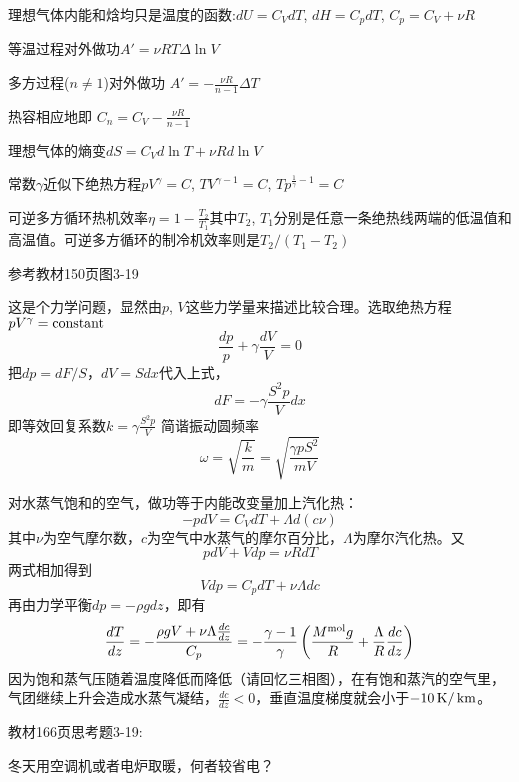 \documentclass[CJK]{beamer}
\begin{document}
\begin{frame}
  \bch
  \bitem
  \item{理想气体内能和焓均只是温度的函数:$dU = C_V dT$, $dH = C_p dT$, $C_p = C_V+\nu R$}
  \item{等温过程对外做功$A'=\nu RT \Delta \ln V$}
  \item{
  多方过程($n\ne 1$)对外做功
  $A' = -\frac{\nu R}{n-1}\Delta T$
  
  热容相应地即
  $C_n = C_V - \frac{\nu R}{n-1}$}
  \item{理想气体的熵变$ dS = C_V d \ln T + \nu R d\ln V$}
  \item{常数$\gamma$近似下绝热方程$pV^\gamma = C$, $TV^{\gamma-1} =C$, $Tp^{\frac{1}{\gamma}-1} = C$}
  \item{可逆多方循环热机效率$\eta = 1- \frac{T_2}{T_1}$其中$T_2$, $T_1$分别是任意一条绝热线两端的低温值和高温值。可逆多方循环的制冷机效率则是$T_2/(T_1-T_2)$}
  \eitem
  \ech  
\end{frame}


\begin{frame}
\bch
参考教材150页图3-19

这是个力学问题，显然由$p$, $V$这些力学量来描述比较合理。选取绝热方程$pV^\gamma = \mathrm{constant}$
$$ \frac{dp}{p} + \gamma \frac{dV}{V} = 0$$
把$dp = dF/S$，$dV = S dx$代入上式，
$$ dF = -\gamma \frac{S^2p}{V} dx $$
即等效回复系数$k =\gamma \frac{S^2p}{V} $ 简谐振动圆频率
$$\omega = \sqrt{\frac{k}{m}} = \sqrt{\frac{\gamma p S^2}{mV}}$$
\ech
\end{frame}

\begin{frame}
\bch
{\small
对水蒸气饱和的空气，做功等于内能改变量加上汽化热：
$$ -pdV = C_V dT + \Lambda d(c\nu) $$
其中$\nu$为空气摩尔数，$c$为空气中水蒸气的摩尔百分比，$\Lambda$为摩尔汽化热。又
$$pdV + Vdp = \nu R dT$$
两式相加得到
$$ Vdp = C_p  dT + \nu \Lambda dc $$
再由力学平衡$ dp = -\rho g dz$，即有
$$ \frac{dT}{dz} =-\frac{\rho g V + \nu\Lambda\frac{dc}{dz}}{C_p} = -\frac{\gamma-1}{\gamma}\left(\frac{M^{\rm mol}g}{R}+\frac{\Lambda}{R}\frac{dc}{dz}\right)$$
因为饱和蒸气压随着温度降低而降低（请回忆三相图），在有饱和蒸汽的空气里，气团继续上升会造成水蒸气凝结，$ \frac{dc}{dz} < 0 $，垂直温度梯度就会小于$-10\,\mathrm{K}/\,\mathrm{km}$。
}
\ech
\end{frame}

\begin{frame}
  \chtitle{\proid  (\sthree)}
  \bch

  教材166页思考题3-19:
  
  冬天用空调机或者电炉取暖，何者较省电？


  \ech
\end{frame}
\end{document}
